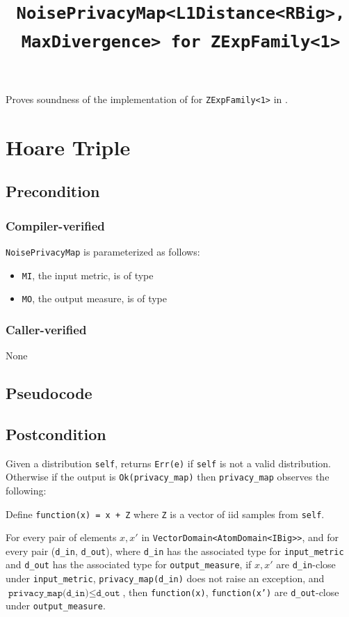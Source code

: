 \documentclass{article}
\title{\texttt{NoisePrivacyMap<L1Distance<RBig>, MaxDivergence> for ZExpFamily<1>}}
\author{\MichaelShoemateAuthor}
\date{}
\begin{document}
\maketitle

\contrib
Proves soundness of the implementation of  for \texttt{ZExpFamily<1>} in .

\section{Hoare Triple}
\subsection*{Precondition}
\subsubsection*{Compiler-verified}
\texttt{NoisePrivacyMap} is parameterized as follows:
\begin{itemize}
    \item \texttt{MI}, the input metric, is of type 
    \item \texttt{MO}, the output measure, is of type 
\end{itemize}

\subsubsection*{Caller-verified}
None

\subsection*{Pseudocode}


\subsection*{Postcondition}
\begin{theorem}
    Given a distribution \texttt{self},
    returns \texttt{Err(e)} if \texttt{self} is not a valid distribution.
    Otherwise if the output is \texttt{Ok(privacy\_map)}
    then \texttt{privacy\_map} observes the following:

    Define \texttt{function(x) = x + Z} where \texttt{Z} is a vector of iid samples from \texttt{self}.

    For every pair of elements $x, x'$ in \texttt{VectorDomain<AtomDomain<IBig>{}>},
    and for every pair (\texttt{d\_in}, \texttt{d\_out}),
    where \texttt{d\_in} has the associated type for \texttt{input\_metric} and \texttt{d\_out} has the associated type for \texttt{output\_measure},
    if $x, x'$ are \texttt{d\_in}-close under \texttt{input\_metric}, \texttt{privacy\_map(d\_in)} does not raise an exception,
    and $\texttt{privacy\_map(d\_in)} \leq \texttt{d\_out}$,
    then \texttt{function(x)}, \texttt{function(x')} are \texttt{d\_out}-close under \texttt{output\_measure}.
\end{theorem}
\end{document}
